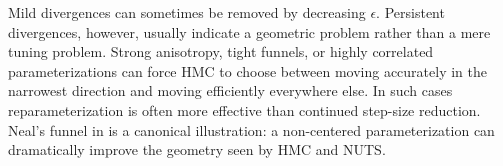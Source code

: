 Mild divergences can sometimes be removed by decreasing $\epsilon$.
Persistent divergences, however, usually indicate a geometric problem rather than a mere tuning problem.
Strong anisotropy, tight funnels, or highly correlated parameterizations can force HMC to choose between moving accurately in the narrowest direction and moving efficiently everywhere else.
In such cases reparameterization is often more effective than continued step-size reduction.
Neal's funnel in  is a canonical illustration: a non-centered parameterization can dramatically improve the geometry seen by HMC and NUTS.
